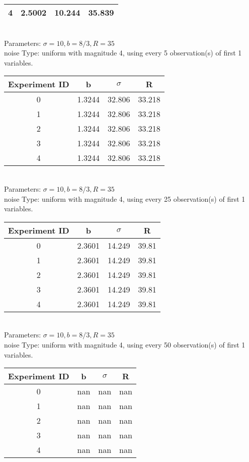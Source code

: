 \begin{multicols}{3}
\begin{tabular}{cccc}
 4 & 2.5002 & 10.244 & 35.839\\ \hline 
 \end{tabular}\\
Parameters: $\sigma=10, b=8/3, R=35$\\
noise Type: uniform with magnitude 4, using every 5 observation(s) of first 1 variables.\\
\begin{tabular}{cccc}
\hline Experiment ID & b & $\sigma$ & R \\ \hline 
0 & 1.3244 & 32.806 & 33.218\\ \hline 
 1 & 1.3244 & 32.806 & 33.218\\ \hline 
 2 & 1.3244 & 32.806 & 33.218\\ \hline 
 3 & 1.3244 & 32.806 & 33.218\\ \hline 
 4 & 1.3244 & 32.806 & 33.218\\ \hline 
 \end{tabular}\\
Parameters: $\sigma=10, b=8/3, R=35$\\
noise Type: uniform with magnitude 4, using every 25 observation(s) of first 1 variables.\\
\begin{tabular}{cccc}
\hline Experiment ID & b & $\sigma$ & R \\ \hline 
0 & 2.3601 & 14.249 & 39.81\\ \hline 
 1 & 2.3601 & 14.249 & 39.81\\ \hline 
 2 & 2.3601 & 14.249 & 39.81\\ \hline 
 3 & 2.3601 & 14.249 & 39.81\\ \hline 
 4 & 2.3601 & 14.249 & 39.81\\ \hline 
 \end{tabular}\\
Parameters: $\sigma=10, b=8/3, R=35$\\
noise Type: uniform with magnitude 4, using every 50 observation(s) of first 1 variables.\\
\begin{tabular}{cccc}
\hline Experiment ID & b & $\sigma$ & R \\ \hline 
0 & nan & nan & nan\\ \hline 
 1 & nan & nan & nan\\ \hline 
 2 & nan & nan & nan\\ \hline 
 3 & nan & nan & nan\\ \hline 
 4 & nan & nan & nan\\ \hline 

\end{tabular}
\end{multicols}
